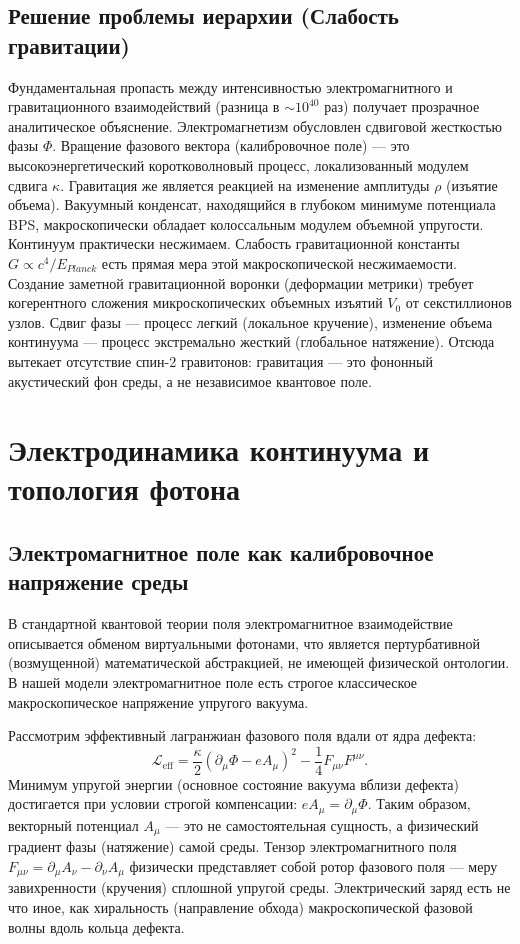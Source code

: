 \documentclass[12pt,a4paper]{article}
\begin{document}
\subsection{Решение проблемы иерархии (Слабость гравитации)}
Фундаментальная пропасть между интенсивностью электромагнитного и гравитационного взаимодействий (разница в $\sim 10^{40}$ раз) получает прозрачное аналитическое объяснение.
Электромагнетизм обусловлен сдвиговой жесткостью фазы $\Phi$. Вращение фазового вектора (калибровочное поле) — это высокоэнергетический коротковолновый процесс, локализованный модулем сдвига $\kappa$.
Гравитация же является реакцией на изменение амплитуды $\rho$ (изъятие объема). Вакуумный конденсат, находящийся в глубоком минимуме потенциала BPS, макроскопически обладает колоссальным модулем объемной упругости. Континуум практически несжимаем.
Слабость гравитационной константы $G \propto c^4 / E_{Planck}$ есть прямая мера этой макроскопической несжимаемости. Создание заметной гравитационной воронки (деформации метрики) требует когерентного сложения микроскопических объемных изъятий $V_0$ от секстиллионов узлов. Сдвиг фазы — процесс легкий (локальное кручение), изменение объема континуума — процесс экстремально жесткий (глобальное натяжение). Отсюда вытекает отсутствие спин-2 гравитонов: гравитация — это фононный акустический фон среды, а не независимое квантовое поле.

\section{Электродинамика континуума и топология фотона}

\subsection{Электромагнитное поле как калибровочное напряжение среды}
В стандартной квантовой теории поля электромагнитное взаимодействие описывается обменом виртуальными фотонами, что является пертурбативной (возмущенной) математической абстракцией, не имеющей физической онтологии. В нашей модели электромагнитное поле есть строгое классическое макроскопическое напряжение упругого вакуума.

Рассмотрим эффективный лагранжиан фазового поля вдали от ядра дефекта:
\begin{equation}
	\mathcal{L}_{\text{eff}} = \frac{\kappa}{2} (\partial_\mu \Phi - e A_\mu)^2 - \frac{1}{4} F_{\mu\nu} F^{\mu\nu}.
\end{equation}
Минимум упругой энергии (основное состояние вакуума вблизи дефекта) достигается при условии строгой компенсации: $e A_\mu = \partial_\mu \Phi$. Таким образом, векторный потенциал $A_\mu$ — это не самостоятельная сущность, а физический градиент фазы (натяжение) самой среды. Тензор электромагнитного поля $F_{\mu\nu} = \partial_\mu A_\nu - \partial_\nu A_\mu$ физически представляет собой ротор фазового поля — меру завихренности (кручения) сплошной упругой среды. Электрический заряд есть не что иное, как хиральность (направление обхода) макроскопической фазовой волны вдоль кольца дефекта.
\end{document}
